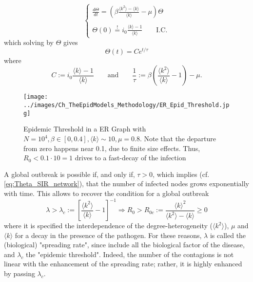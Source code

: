 \documentclass[a4paper,12pt,twoside]{book} %
\theoremstyle{definition}
\begin{document}
\begin{equation}
	\begin{cases}
		\frac{d\Theta}{dt} = \left( \beta\frac{\langle k^2 \rangle - \langle k \rangle}{\langle k \rangle} - \mu \right) \Theta \\ \\
		\Theta(0) \stackrel{!}{=} i_0 \frac{\langle k \rangle -1}{\langle k \rangle } \qquad \text{I.C.}
	\end{cases}
\end{equation}
which solving by $\Theta$ gives 
\begin{equation}
	\Theta(t) = C e^{t/\tau}
	\label{eq:Theta_SIR_network}
\end{equation} 
where
\begin{equation}
	C := i_0\frac{\langle k \rangle -1}{\langle k \rangle}  \qquad \text{and} \qquad
	\frac{1}{\tau} := \beta \left(\frac{\langle k^2 \rangle}{\langle k \rangle}-1\right)
	-\mu.
	\label{eq:tau_SIR_networks}
\end{equation}

\begin{figure}[t]
	\texttt{[image: ../images/Ch\_TheEpidModels\_Methodology/ER\_Epid\_Threshold.jpg]}
	\centering
	\caption{Epidemic Threshold in a ER Graph with $N = 10^{4}, \beta \in [0,0.4], \langle k \rangle \sim 10, \mu = 0.8$. Note that the departure from zero happens near 0.1, due to finite size effects. Thus, $R_0 < 0.1 \cdot 10 = 1$ drives to a fast-decay of the infection}
	\label{fig:ER_Epidem_Thr}
\end{figure}

A global outbreak is possible if, and only if, $\tau > 0$, which implies (cf. \autoref{eq:Theta_SIR_network}), that the number of infected nodes grows exponentially with time. This allows to recover the condition for a global outbreak
\begin{equation}
	\lambda > 
	\lambda_c:=\left[ \frac{\langle k^2 \rangle}{\langle k \rangle} - 1\right]^{-1}
	\Rightarrow
	R_0 > R_{0c}:=\frac{ \langle k \rangle^2 }{\langle k^2 \rangle-\langle k \rangle} \geq 0
	\label{eq:lambdac_SIR_network}
\end{equation}
where it is specified the interdependence of the degree-heterogeneity ($\langle k^2 \rangle$), $\mu$ and $\langle k \rangle$ for a decay in the presence of the pathogen. For these reasons, $\lambda$ is called the (biological) "spreading rate", since include all the biological factor of the disease, and $\lambda_c$ the "epidemic threshold". Indeed, the number of the contagions is not linear with the enhancement of the spreading rate; rather, it is highly enhanced by passing $\lambda_c$. 
\end{document}
